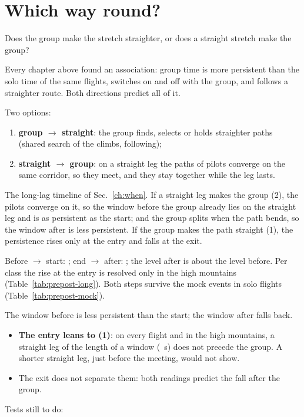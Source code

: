 \documentclass[10pt,a4paper]{article}
\newcommand{\Q}{\item[\textcolor{question}{\textbf{Q.}}]\color{question}}
\newcommand{\Res}{\item[\textcolor{answer}{\textbf{Result.}}]\color{black}}
\newcommand{\Obs}{\item[\textcolor{answer}{\textbf{Observation.}}]\color{black}}
\newcommand{\Hyp}{\item[\textcolor{question}{\textbf{Hypothesis.}}]\color{question}}
\newcommand{\Ded}{\item[\textcolor{answer}{\textbf{Deduction.}}]\color{black}}
\newcommand{\Com}{\item[\textcolor{black}{\textbf{Comment.}}]\color{black}}
\newcommand{\Why}{\item[\textcolor{black}{\textbf{Why.}}]\color{black}}
\newcommand{\Tool}{\item[\textcolor{black}{\textbf{Tool.}}]\color{black}}
\newenvironment{step}{\begin{description}[leftmargin=0pt, itemsep=7pt, topsep=8pt]}{\end{description}}
\begin{document}
\section{Which way round?}\label{which-way}

\begin{step}
\Q Does the group make the stretch straighter, or does a straight stretch make the group?
\Why Every chapter above found an association: group time is more persistent than the solo time of the same flights,
  switches on and off with the group, and follows a straighter route. Both directions predict all of it.
\Hyp Two options:
  \begin{enumerate}
  \item \textbf{group $\to$ straight}: the group finds, selects or holds straighter paths (shared search of
    the climbs, following);
  \item \textbf{straight $\to$ group}: on a straight leg the paths of pilots converge on the same corridor,
    so they meet, and they stay together while the leg lasts.
  \end{enumerate}
\Tool The long-lag timeline of Sec.~\ref{ch:when}. If a straight leg makes the group (2), the pilots converge on it,
  so the window before the group already lies on the straight leg and is as persistent as the start; and the group
  splits when the path bends, so the window after is less persistent. If the group makes the path straight (1), the
  persistence rises only at the entry and falls at the exit.
\Res Before $\to$ start: \WhenAllLongStartMinusPre{} \WhenAllLongStartMinusPreBand; end $\to$ after:
  \WhenAllLongPostMinusEnd{} \WhenAllLongPostMinusEndBand; the level after is about the level before. Per class the
  rise at the entry is resolved only in the high mountains (Table~\ref{tab:prepost-long}). Both steps survive the
  mock events in solo flights (Table~\ref{tab:prepost-mock}).
\Obs The window before is less persistent than the start; the window after falls back.
\Ded\mbox{}
  \begin{itemize}
  \item \textbf{The entry leans to (1)}: on every flight and in the high mountains, a straight leg of the length of a
    window (\WhenWindow~s) does not precede the group. A shorter straight leg, just before the meeting, would not
    show.
  \item The exit does not separate them: both readings predict the fall after the group.
  \end{itemize}
\Com Tests still to do:
  \begin{itemize}

\end{itemize}
\end{step}
\end{document}
